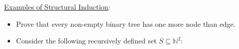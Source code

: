 \documentclass[12pt]{article}
\begin{document}
\underline{Examples of Structural Induction}: 
\begin{itemize}
\item Prove that every non-empty binary tree has one more node than edge.

\item Consider the following recursively defined set $S \subseteq \mathbb{N}^2$:

\end{itemize}
\end{document}
